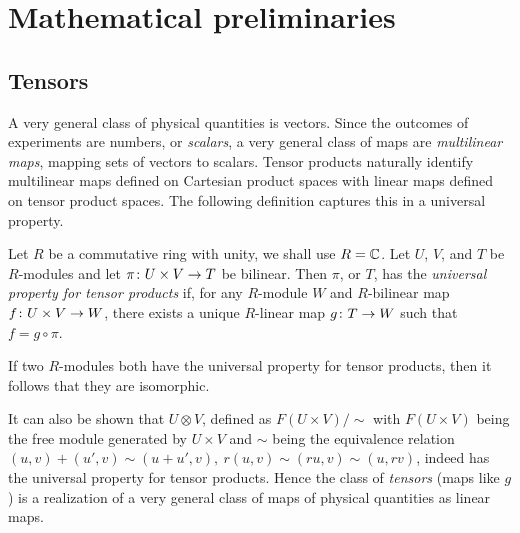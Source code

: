 \chapter{Mathematical preliminaries}%
\label{cha:mathematical_preliminaries}


\section{Tensors}%
\label{sec:tensors}


A very general class of physical quantities is vectors. Since the outcomes of experiments are numbers, or \emph{scalars}, a very general class of maps are \emph{multilinear maps}, mapping sets of vectors to scalars. Tensor products naturally identify multilinear maps defined on Cartesian product spaces with linear maps defined on tensor product spaces. The following definition captures this in a universal property. 

\begin{definition}\label{def:tensor}
	Let $R$ be a commutative ring with unity, we shall use $R = \mathbb{C}$. Let $U$, $V$, and $T$ be $R$-modules and let $\pi \colon U \times V \to T$ be bilinear. Then $\pi$, or $T$, has the \emph{universal property for tensor products} if, for any $R$-module $W$ and $R$-bilinear map $f \colon U \times V \to W$, there exists a unique $R$-linear map $g \colon T \to W$ such that $f = g \circ \pi$.
\end{definition}
If two $R$-modules both have the universal property for tensor products, then it follows that they are isomorphic.

It can also be shown that $U \otimes V$, defined as $F(U \times V) / \!\sim$ with $F(U \times V)$ being the free module generated by $U \times V$ and $\sim$ being the equivalence relation $(u, v) + (u', v) \sim (u + u', v),~ r (u, v) \sim (r u, v) \sim (u, r v)$, indeed has the universal property for tensor products. Hence the class of \emph{tensors} (maps like $g$) is a realization of a very general class of maps of physical quantities as linear maps.


